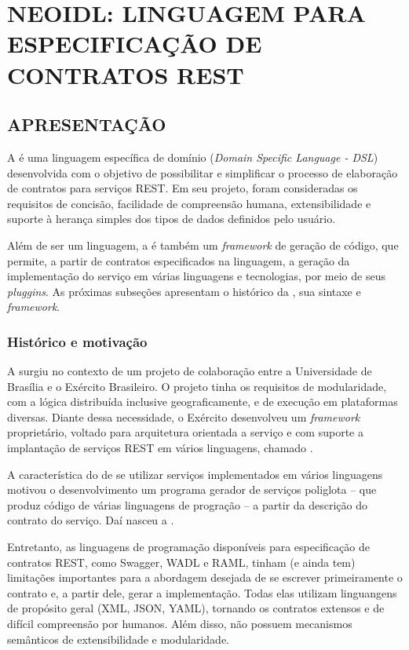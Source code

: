 \chapter{NEOIDL: LINGUAGEM PARA ESPECIFICAÇÃO DE CONTRATOS REST	}
\vspace{-6mm}


\section{APRESENTAÇÃO}
\label{apresentacaoNeoIDL}

A \neoidl{} é uma linguagem específica de domínio (\textit{Domain Specific
Language - DSL}) desenvolvida com o objetivo de possibilitar e simplificar o
processo de elaboração de contratos para serviços REST. Em seu projeto, foram
consideradas os requisitos de concisão, facilidade de compreensão humana,
extensibilidade e suporte à herança simples dos tipos de dados definidos pelo
usuário.

Além de ser um linguagem, a \neoidl{} é também um \textit{framework} de geração
de código, que permite, a partir de contratos especificados na linguagem, a geração
da implementação do serviço em várias linguagens e tecnologias, por meio de seus
\textit{pluggins}. As próximas subseções apresentam o histórico da \neoidl{},
sua sintaxe e \textit{framework}.


\subsection{Histórico e motivação}
\label{histMotivNeoIDL}
\vspace{-6mm}

A \neoidl{} surgiu no contexto de um projeto de colaboração entre a Universidade
de Brasília e o Exército Brasileiro. O projeto tinha os requisitos de modularidade,
com a lógica distribuída inclusive geograficamente, e de execução em plataformas
diversas. Diante dessa necessidade, o Exército desenvolveu um \textit{framework}
proprietário, voltado para arquitetura orientada a serviço e com suporte
a implantação de serviços REST em vários linguagens, chamado \neocortex{}.

A característica do \neocortex{} de se utilizar serviços implementados em vários
linguagens motivou o desenvolvimento um programa gerador de serviços poliglota
-- que produz código de várias linguagens de progração -- a partir da descrição
do contrato do serviço. Daí nasceu a \neoidl{}.

Entretanto, as linguagens de programação disponíveis para especificação de
contratos REST, como Swagger, WADL e RAML, tinham (e ainda tem) limitações
importantes para a abordagem desejada de se escrever primeiramente o contrato e,
a partir dele, gerar a implementação. Todas elas utilizam linguangens de
propósito geral (XML, JSON, YAML), tornando os contratos extensos e de difícil
compreensão por humanos. Além disso, não possuem mecanismos semânticos de
extensibilidade e modularidade.

